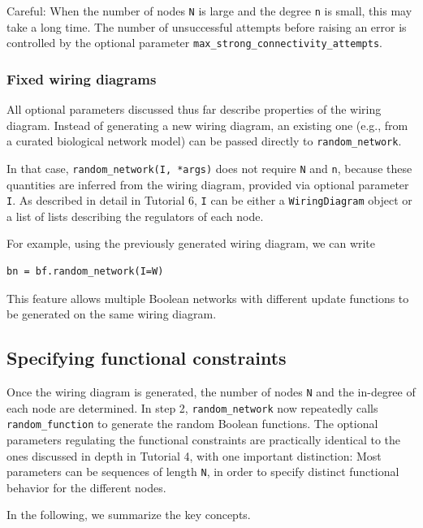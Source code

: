 \documentclass[
]{article}
\begin{document}
Careful: When the number of nodes \texttt{N} is large and the degree
\texttt{n} is small, this may take a long time. The number of
unsuccessful attempts before raising an error is controlled by the
optional parameter \texttt{max\_strong\_connectivity\_attempts}.

\subsubsection{Fixed wiring diagrams}\label{fixed-wiring-diagrams}

All optional parameters discussed thus far describe properties of the
wiring diagram. Instead of generating a new wiring diagram, an existing
one (e.g., from a curated biological network model) can be passed
directly to \texttt{random\_network}.

In that case, \texttt{random\_network(I,\ *args)} does not require
\texttt{N} and \texttt{n}, because these quantities are inferred from
the wiring diagram, provided via optional parameter \texttt{I}. As
described in detail in Tutorial 6, \texttt{I} can be either a
\texttt{WiringDiagram} object or a list of lists describing the
regulators of each node.

For example, using the previously generated wiring diagram, we can write

\begin{lstlisting}
bn = bf.random_network(I=W)
\end{lstlisting}

This feature allows multiple Boolean networks with different update
functions to be generated on the same wiring diagram.

\subsection{Specifying functional
constraints}\label{specifying-functional-constraints}

Once the wiring diagram is generated, the number of nodes \texttt{N} and
the in-degree of each node are determined. In step 2,
\texttt{random\_network} now repeatedly calls \texttt{random\_function}
to generate the random Boolean functions. The optional parameters
regulating the functional constraints are practically identical to the
ones discussed in depth in Tutorial 4, with one important distinction:
Most parameters can be sequences of length \texttt{N}, in order to
specify distinct functional behavior for the different nodes.

In the following, we summarize the key concepts.
\end{document}
